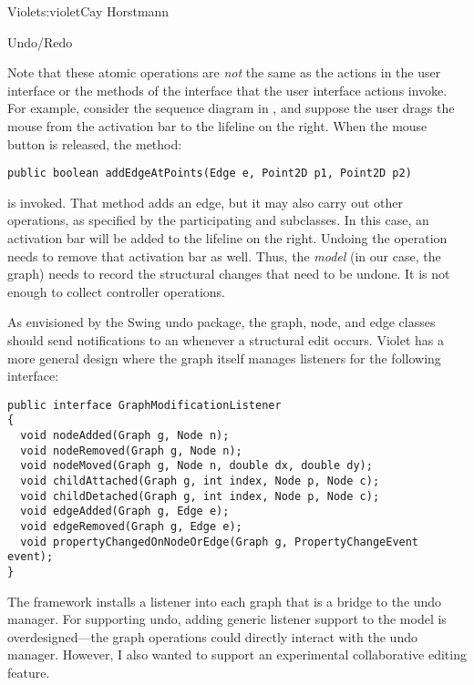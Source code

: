 \begin{aosachapter}{Violet}{s:violet}{Cay Horstmann}
\begin{aosasect1}{Undo/Redo}

Note that these atomic operations are \emph{not} the same as the
actions in the user interface or the methods of the 
interface that the user interface actions invoke. For example,
consider the sequence diagram in ,
and suppose the user drags the mouse from the activation bar to the
lifeline on the right. When the mouse button is released, the method:

\begin{verbatim}
public boolean addEdgeAtPoints(Edge e, Point2D p1, Point2D p2)
\end{verbatim}

\noindent
is invoked. That method adds an edge, but it may also carry out other
operations, as specified by the participating  and
 subclasses. In this case, an activation bar will be added
to the lifeline on the right. Undoing the operation needs to remove
that activation bar as well. Thus, the \emph{model} (in our case, the
graph) needs to record the structural changes that need to be
undone. It is not enough to collect controller operations.

As envisioned by the Swing undo package, the graph, node, and edge
classes should send  notifications to an
 whenever a structural edit occurs. Violet has a
more general design where the graph itself manages listeners for the
following interface:

\begin{verbatim}
public interface GraphModificationListener
{
  void nodeAdded(Graph g, Node n);
  void nodeRemoved(Graph g, Node n);
  void nodeMoved(Graph g, Node n, double dx, double dy);
  void childAttached(Graph g, int index, Node p, Node c);
  void childDetached(Graph g, int index, Node p, Node c);
  void edgeAdded(Graph g, Edge e);
  void edgeRemoved(Graph g, Edge e);
  void propertyChangedOnNodeOrEdge(Graph g, PropertyChangeEvent event);
}
\end{verbatim}

The framework installs a listener into each graph that is a bridge to
the undo manager. For supporting undo, adding generic listener support to 
the model is overdesigned---the graph operations could directly interact
with the undo manager. However, I also wanted to support an experimental
collaborative editing feature.


\end{aosasect1}
\end{aosachapter}

